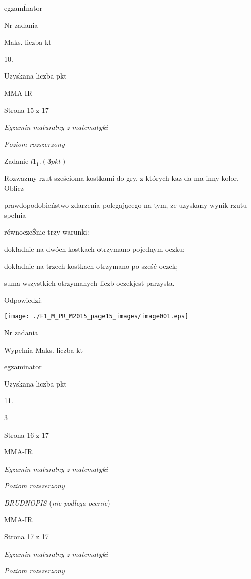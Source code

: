 \documentclass[a4paper,12pt]{article}
\begin{document}
egzamÍnator

Nr zadania

Maks. liczba kt

10.

Uzyskana liczba pkt

MMA-IR

Strona 15 z 17





{\it Egzamin maturalny z matematyki}

{\it Poziom rozszerzony}

Zadanie $l1_{1}. (3pkt)$

Rozwazmy rzut sześcioma kostkami do gry, z których $\mathrm{k}\mathrm{a}\dot{\mathrm{z}}$ da ma inny kolor. Oblicz

prawdopodobieństwo zdarzenia polegającego na tym, $\dot{\mathrm{z}}\mathrm{e}$ uzyskany wynik rzutu spełnia

równoczeŚnie trzy warunki:

dokładnie na dwóch kostkach otrzymano pojednym oczku;

dokładnie na trzech kostkach otrzymano po sześć oczek;

suma wszystkich otrzymanych liczb oczekjest parzysta.

Odpowiedzí:
\begin{center}
\texttt{[image: ./F1\_M\_PR\_M2015\_page15\_images/image001.eps]}
\end{center}
Nr zadania

Wypelnia Maks. liczba kt

egzaminator

Uzyskana liczba pkt

11.

3

Strona 16 z 17

MMA-IR





{\it Egzamin maturalny z matematyki}

{\it Poziom rozszerzony}

{\it BRUDNOPIS} ({\it nie podlega ocenie})

MMA-IR

Strona 17 z 17





{\it Egzamin maturalny z matematyki}

{\it Poziom rozszerzony}
\end{document}
